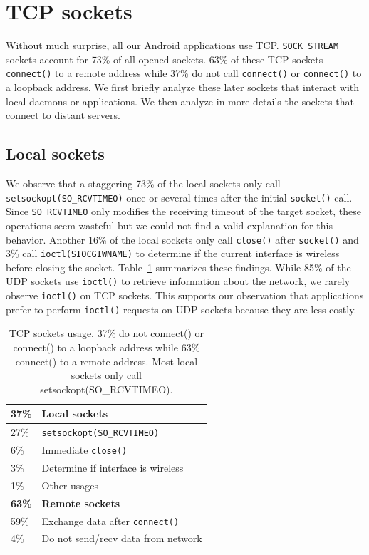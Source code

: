 \section{TCP sockets}\label{sec:tcp}

Without much surprise, all our Android applications use TCP.
\texttt{SOCK\_STREAM} sockets account for 73\% of all opened
sockets. 63\% of these TCP sockets \texttt{connect()} to a remote
address while 37\% do not call \texttt{connect()} or \texttt{connect()}
to a loopback address. We first briefly analyze these later sockets
that interact with local daemons or applications. We then
analyze in more details the sockets that connect to distant servers.

\subsection{Local sockets}

We observe that a staggering 73\% of the local sockets only call
\texttt{setsockopt(SO\_RCVTIMEO)} once or several times after the initial
\texttt{socket()} call. Since \texttt{SO\_RCVTIMEO} only modifies the receiving timeout of the target socket,
these operations seem wasteful but we could not find a valid explanation for
this behavior. Another 16\% of the local sockets only call \texttt{close()}
after \texttt{socket()} and 3\% call \texttt{ioctl(SIOCGIWNAME)} to determine
if the current interface is wireless before closing the socket.
Table~\ref{tab:tcp_sockets_usage} summarizes these findings. While 85\% of the
UDP sockets use \texttt{ioctl()} to retrieve information about the network, we
rarely observe \texttt{ioctl()} on TCP sockets. This supports our
observation that applications prefer to perform \texttt{ioctl()} requests
on UDP sockets because they are less costly.

\begin{table}[]
\centering
\begin{tabular}{ll}
\hline
\textbf{37\%} & \textbf{Local sockets}  \\ \hline
27\%                                & \texttt{setsockopt(SO\_RCVTIMEO)}          \\
6\%                                 & Immediate \texttt{close()}                 \\
3\%                                 & Determine if interface is wireless         \\
1\%                                 & Other usages                               \\ \hline
\textbf{63\%} & \textbf{Remote sockets} \\ \hline
59\%                                & Exchange data after \texttt{connect()}     \\
4\%                                 & Do not send/recv data from network
\end{tabular}
\caption{TCP sockets usage. \textmd{37\% do not connect()
or connect() to a loopback address while 63\% connect() to a remote address.
Most local sockets only call setsockopt(SO\_RCVTIMEO).}}
\label{tab:tcp_sockets_usage}
\end{table}

